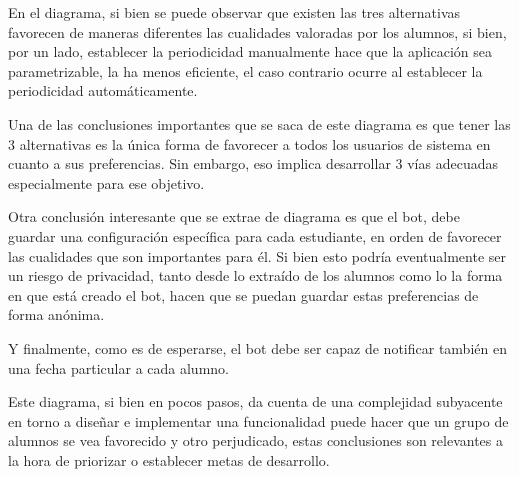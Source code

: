         \par En el diagrama, si bien se puede observar que existen las tres alternativas favorecen de maneras diferentes las cualidades valoradas por los alumnos, si bien, por un lado, establecer la periodicidad manualmente hace que la aplicación sea parametrizable, la ha menos eficiente, el caso contrario ocurre al establecer la periodicidad automáticamente.

        \par Una de las conclusiones importantes que se saca de este diagrama es que tener las 3 alternativas es la única forma de favorecer a todos los usuarios de sistema en cuanto a sus preferencias. Sin embargo, eso implica desarrollar 3 vías adecuadas especialmente para ese objetivo.
        \par Otra conclusión interesante que se extrae de diagrama es que el bot, debe guardar una configuración específica para cada estudiante, en orden de favorecer las cualidades que son importantes para él. Si bien esto podría eventualmente ser un riesgo de privacidad, tanto desde lo extraído de los alumnos como lo la forma en que está creado el bot, hacen que se puedan guardar estas preferencias de forma anónima.
        \par Y finalmente, como es de esperarse, el bot debe ser capaz de notificar también en una fecha particular a cada alumno.
        \par Este diagrama, si bien en pocos pasos, da cuenta de una complejidad subyacente en torno a diseñar e implementar una funcionalidad puede hacer que un grupo de alumnos se vea favorecido y otro perjudicado, estas conclusiones son relevantes a la hora de priorizar o establecer metas de desarrollo.

